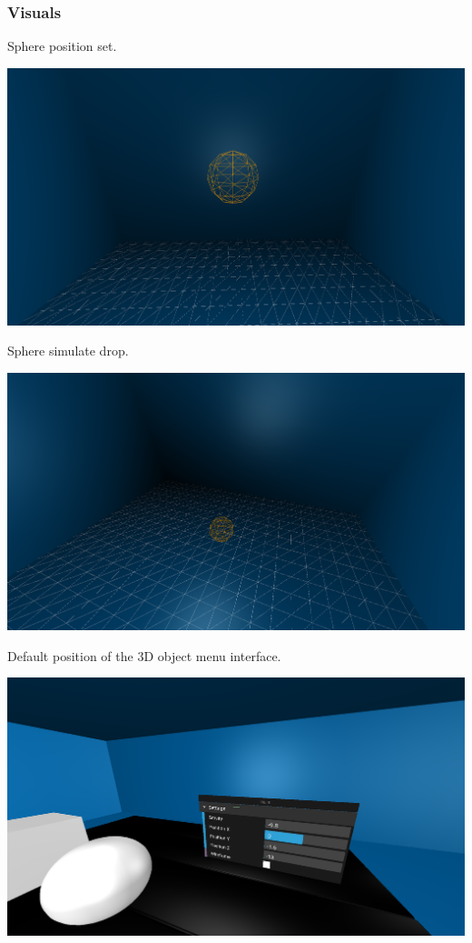 \documentclass[onecolumn, draftclsnofoot,10pt, compsoc]{IEEEtran}
\begin{document}
   \subsubsection{Visuals}
   Sphere position set.
   
   \includegraphics[width=\linewidth]{images/Cannonjs.png}
   
   \newpage
   
   Sphere simulate drop.
   
   \includegraphics[width=\linewidth]{images/CannonjsDrop.png}
   
   Default position of the 3D object menu interface.
   
   \includegraphics[width=\linewidth]{images/menu-gui.png}
   
\end{document}
